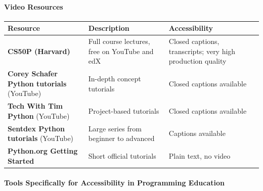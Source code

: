 \documentclass[
  justified,
  openright,
]{tufte-book}
\let\subsection\paragraph
\let\paragraph\paragraph
\let\subsection\paragraph
\let\paragraph\paragraph
\begin{document}
\subsection{Video Resources}\label{video-resources}

\begin{fullwidth}{\def\LTcaptype{none} %
\begin{longtable}[]{@{}
  >{\raggedright\arraybackslash}p{}
  >{\raggedright\arraybackslash}p{}
  >{\raggedright\arraybackslash}p{}@{}}
\toprule\noalign{}
\begin{minipage}[b]{\linewidth}\raggedright
Resource
\end{minipage} & \begin{minipage}[b]{\linewidth}\raggedright
Description
\end{minipage} & \begin{minipage}[b]{\linewidth}\raggedright
Accessibility
\end{minipage} \\
\midrule\noalign{}
\endhead
\bottomrule\noalign{}
\endlastfoot
\textbf{CS50P (Harvard)} & Full course lectures, free on YouTube and edX
& Closed captions, transcripts; very high production quality \\
\textbf{Corey Schafer Python tutorials} (YouTube) & In-depth concept
tutorials & Closed captions available \\
\textbf{Tech With Tim Python} (YouTube) & Project-based tutorials &
Closed captions available \\
\textbf{Sentdex Python tutorials} (YouTube) & Large series from beginner
to advanced & Captions available \\
\textbf{Python.org Getting Started} & Short official tutorials & Plain
text, no video \\
\end{longtable}
}
\end{fullwidth}

\subsection{Tools Specifically for Accessibility in Programming
Education}\label{tools-specifically-for-accessibility-in-programming-education}
\end{document}
